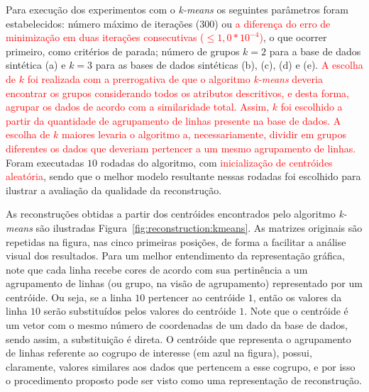 \documentclass[
    12pt,                %
    oneside,            %
    a4paper,            %
    english,            %
    brazil                %
    ]{abntex2ppgsi}
\begin{document}
Para execução dos experimentos com o \textit{k-means} os seguintes parâmetros foram estabelecidos: número máximo de iterações ($300$) ou  \textcolor{red}{a diferença do erro de minimização em duas iterações consecutivas ($\leq 1,0 * 10^{-4}$)}, o que ocorrer primeiro, como critérios de parada; número de grupos $k = 2$ para a base de dados sintética (a) e $k = 3$ para as bases de dados sintéticas (b), (c), (d) e (e). \textcolor{red}{A escolha de $k$ foi realizada com a prerrogativa de que o algoritmo \textit{k-means} deveria encontrar os grupos considerando todos os atributos descritivos, e desta forma, agrupar os dados de acordo com a similaridade total. Assim, $k$ foi escolhido a partir da quantidade de agrupamento de linhas presente na base de dados. A escolha de $k$ maiores levaria o algoritmo a, necessariamente, dividir em grupos diferentes os dados que deveriam pertencer a um mesmo agrupamento de linhas.} Foram executadas $10$ rodadas do algoritmo, com \textcolor{red}{inicialização de centróides aleatória}, sendo que o melhor modelo resultante nessas rodadas foi escolhido para ilustrar a avaliação da qualidade da reconstrução.

As reconstruções obtidas a partir dos centróides encontrados pelo algoritmo \textit{k-means} são ilustradas Figura~\ref{fig:reconstruction:kmeans}. As matrizes originais são repetidas na figura, nas cinco primeiras posições, de forma a facilitar a análise visual dos resultados. Para um melhor entendimento da representação gráfica, note que cada linha recebe cores de acordo com sua pertinência a um agrupamento de linhas (ou grupo, na visão de agrupamento) representado por um centróide. Ou seja, se a linha $10$ pertencer ao centróide $1$, então os valores da linha $10$ serão substituídos pelos valores do centróide $1$. Note que o centróide é um vetor com o mesmo número de coordenadas de um dado da base de dados, sendo assim, a substituição é direta. O centróide que representa o agrupamento de linhas referente ao cogrupo de interesse (em azul na figura), possui, claramente, valores similares aos dados que pertencem a esse cogrupo, e por isso o procedimento proposto pode ser visto como uma representação de reconstrução.
\end{document}
